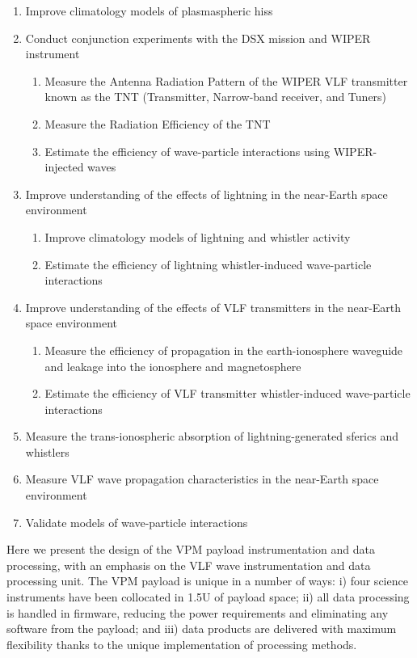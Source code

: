\begin{enumerate}[noitemsep]
\item Improve climatology models of plasmaspheric hiss
\item Conduct conjunction experiments with the DSX mission and WIPER instrument
	\begin{enumerate}[noitemsep]
	\item Measure the Antenna Radiation Pattern of the WIPER VLF transmitter known as the TNT (Transmitter, Narrow-band receiver, and Tuners)
	\item Measure the Radiation Efficiency of the TNT
	\item Estimate the efficiency of wave-particle interactions using WIPER-injected waves
	\end{enumerate}
\item Improve understanding of the effects of lightning in the near-Earth space environment
	\begin{enumerate}[noitemsep]
	\item Improve climatology models of lightning and whistler activity
	\item Estimate the efficiency of lightning whistler-induced wave-particle interactions
	\end{enumerate}
\item Improve understanding of the effects of VLF transmitters in the near-Earth space environment
	\begin{enumerate}[noitemsep]
	\item Measure the efficiency of propagation in the earth-ionosphere waveguide and leakage into the ionosphere and magnetosphere
	\item Estimate the efficiency of VLF transmitter whistler-induced wave-particle interactions
	\end{enumerate}
\item Measure the trans-ionospheric absorption of lightning-generated sferics and whistlers
\item Measure VLF wave propagation characteristics in the near-Earth space environment
\item Validate models of wave-particle interactions
\end{enumerate}


Here we present the design of the VPM payload instrumentation and data processing, with an emphasis on the VLF wave instrumentation and data processing unit. The VPM payload is unique in a number of ways: i) four science instruments have been collocated in 1.5U of payload space; ii) all data processing is handled in firmware, reducing the power requirements and eliminating any software from the payload; and iii) data products are delivered with maximum flexibility thanks to the unique implementation of processing methods.


